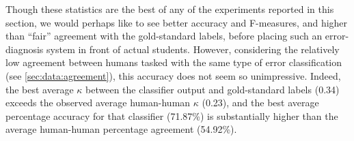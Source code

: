 \documentclass[a4paper]{article}
\begin{document}
		Though these statistics are the best of any of the experiments reported in this section, we would perhaps like to see better accuracy and F-measures, and higher than ``fair'' agreement \cite{Landis1977} with the gold-standard labels, before placing such an error-diagnosis system in front of actual students.
		However, considering the relatively low agreement between humans tasked with the same type of error classification (see \cref{sec:data:agreement}), this accuracy does not seem so unimpressive.
		Indeed, the best average $\kappa$ between the classifier output and gold-standard labels (0.34) exceeds the observed average human-human $\kappa$ (0.23), and the best average percentage accuracy for that classifier (71.87\%) is substantially higher than the average human-human percentage agreement (54.92\%). 
		
\end{document}
